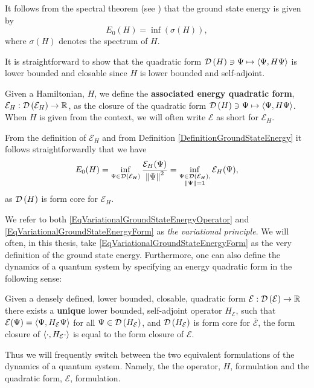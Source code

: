 \begin{remark}
	It follows from the spectral theorem (see \cite{reed1981functional}) that the ground state energy is given by 	$$
	E_0(H)=\inf(\sigma(H)),
	$$
	where $ \sigma(H) $ denotes the spectrum of $ H $.
\end{remark}
\begin{remark}
	It is straightforward to show that the quadratic form $ \mathcal D\left(H\right)\ni\Psi\mapsto\left\langle\Psi,H\Psi\right\rangle $ is lower bounded and closable since $ H $ is lower bounded and self-adjoint.
\end{remark}
\begin{definition}
	Given a Hamiltonian, $ H $, we define the \textbf{associated energy quadratic form}, $ \mathcal{E}_H:\mathcal D\left(\mathcal{E}_H\right)\to \mathbb{R} $, as the closure of the quadratic form $ \mathcal D\left(H\right)\ni\Psi\mapsto\left\langle\Psi,H\Psi\right\rangle $. When $ H $ is given from the context, we will often write $ \mathcal{E} $ as short for $ \mathcal{E}_H $.
\end{definition}
\begin{remark}\label{RemarkVariationalPrinciple2}
	From the definition of $\mathcal{E}_H$ and from Definition \ref{DefinitionGroundStateEnergy} it follows straightforwardly that we have \begin{equation}\label{EqVariationalGroundStateEnergyForm}
		E_0(H)=\inf_{\Psi\in \mathcal D\left(\mathcal{E}_H\right)}\frac{\mathcal{E}_H(\Psi)}{\left\lVert \Psi \right\rVert^2}=\inf_{\substack{\Psi\in \mathcal D\left(\mathcal{E}_H\right),\\\left\lVert \Psi \right\rVert=1}}\mathcal{E}_H(\Psi), 
	\end{equation}
	as $ \mathcal D\left(H\right) $ is form core for $\mathcal{E}_H$.
\end{remark}
We refer to both \eqref{EqVariationalGroundStateEnergyOperator} and \eqref{EqVariationalGroundStateEnergyForm} as \emph{the variational principle}.
We will often, in this thesis, take \eqref{EqVariationalGroundStateEnergyForm} as the very definition of the ground state energy. Furthermore, one can also define the dynamics of a quantum system by specifying an energy quadratic form in the following sense:
\begin{remark}\label{RemarkOperatorFromQuadraticForm}
	Given a densely defined, lower bounded, closable, quadratic form $ \mathcal{E}:\mathcal D\left(\mathcal{E}\right)\to \mathbb{R} $ there exists a \textbf{unique} lower bounded, self-adjoint operator $ H_\mathcal{E} $, such that $ \mathcal{E}(\Psi)=\left\langle\Psi,H_\mathcal{E}\Psi\right\rangle $ for all $ \Psi\in \mathcal D\left(H_\mathcal{E}\right) $, and $ \mathcal D\left(H_\mathcal{E}\right) $ is form core for $\overline{\mathcal{E}}$, \ie the form closure of $ \left\langle\cdot,H_\mathcal{E}\cdot\right\rangle $ is equal to the form closure of $\mathcal{E}$. 
\end{remark}
Thus we will frequently switch between the two equivalent formulations of the dynamics of a quantum system. Namely, the the operator, $ H $, formulation and the quadratic form, $ \mathcal{E} $, formulation.
